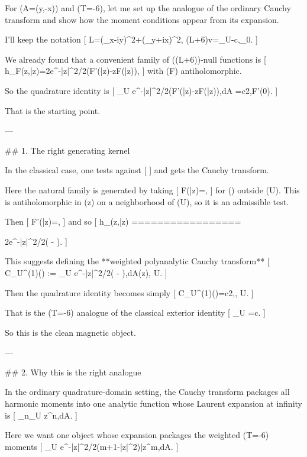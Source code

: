 For (A=(y,-x)) and (T=-6), let me set up the analogue of the ordinary Cauchy transform and show how the moment conditions appear from its expansion.

I’ll keep the notation
[
L=(\partial_x-iy)^2+(\partial_y+ix)^2,
\qquad (L+6)v=_U-c,\delta_0.
]

We already found that a convenient family of ((L+6))-null functions is
[
h_F(z,\bar z)=2e^{-|z|^2/2}\big(F'(\bar z)-zF(\bar z)\big),
]
with (F) antiholomorphic.

So the quadrature identity is
[
\int_U e^{-|z|^2/2}\big(F'(\bar z)-zF(\bar z)\big),dA
=\frac c2,F'(0).
]

That is the starting point.

---

## 1. The right generating kernel

In the classical case, one tests against
[
]
and gets the Cauchy transform.

Here the natural family is generated by taking
[
F(\bar z)=,
]
for (\zeta) outside (\overline U). This is antiholomorphic in (z) on a neighborhood of (U), so it is an admissible test.

Then
[
F'(\bar z)=,
]
and so
[
h_\zeta(z,\bar z)
=================

2e^{-|z|^2/2}\left(
-
\right).
]

This suggests defining the **weighted polyanalytic Cauchy transform**
[
\mathcal C_U^{(1)}(\zeta)
:=
\int_U e^{-|z|^2/2}\left(
-
\right),dA(z),
\qquad \zeta\notin \overline U.
]

Then the quadrature identity becomes simply
[
\mathcal C_U^{(1)}(\zeta)=\frac c2,,
\qquad \zeta\notin \overline U.
]

That is the (T=-6) analogue of the classical exterior identity
[
\int_U =\frac c\zeta.
]

So this is the clean magnetic object.

---

## 2. Why this is the right analogue

In the ordinary quadrature-domain setting, the Cauchy transform packages all harmonic moments into one analytic function whose Laurent expansion at infinity is
[
\sum_{n}\int_U z^n,dA.
]

Here we want one object whose expansion packages the weighted (T=-6) moments
[
\int_U e^{-|z|^2/2}(m+1-|z|^2)\bar z^m,dA.
]

